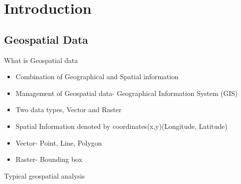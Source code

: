 \section[Introduction]{Introduction}
\subsection[Geospatial Data]{Geospatial Data}


\begin{frame}{What is Geospatial data}
\begin{beamerboxesrounded}{}
	\begin{itemize}
		\item Combination of Geographical and Spatial information 
		\item Management of Geospatial data- Geographical Information System (GIS)
		\item Two data types, Vector and Raster 
		\item Spatial Information denoted by coordinates(x,y)(Longitude, Latitude)
		\item Vector- Point, Line, Polygon
		\item Raster- Bounding box
\end{itemize}
\end{beamerboxesrounded}
\end{frame}


\begin{frame}{Typical geospatial analysis}




\end{frame}




